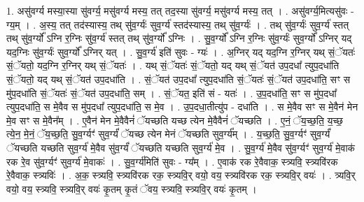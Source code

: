 \documentclass[17pt]{extarticle}
\begin{document}
1. असु॑वर्ग्य मस्या॒स्या सु॑वर्ग्य॒ मसु॑वर्ग्य मस्य॒ तत् तद॒स्या सु॑वर्ग्य॒ मसु॑वर्ग्य मस्य॒ तत् । . असु॑वर्ग्य॒मित्यसु॑वः - ग्य॒म् । . अ॒स्य॒ तत् तद॑स्यास्य॒ तथ् सु॑व॒र्ग्यः॑ सुव॒र्ग्य॑ स्तद॑स्यास्य॒ तथ् सु॑व॒र्ग्यः॑ । . तथ् सु॑व॒र्ग्यः॑ सुव॒र्ग्य॑ स्तत् तथ् सु॑व॒र्ग्यो᳚ ऽग्नि र॒ग्निः सु॑व॒र्ग्य॑ स्तत् तथ् सु॑व॒र्ग्यो᳚ ऽग्निः । . सु॒व॒र्ग्यो᳚ ऽग्नि र॒ग्निः सु॑व॒र्ग्यः॑ सुव॒र्ग्यो᳚ ऽग्निर् यद् यद॒ग्निः सु॑व॒र्ग्यः॑ सुव॒र्ग्यो᳚ ऽग्निर् यत् । . सु॒व॒र्ग्य॑ इति॑ सुवः - ग्यः॑ । . अ॒ग्निर् यद् यद॒ग्नि र॒ग्निर् यथ् सं॒ॅयतः॑ सं॒ॅयतो॒ यद॒ग्नि र॒ग्निर् यथ् सं॒ॅयतः॑ । . यथ् सं॒ॅयतः॑ सं॒ॅयतो॒ यद् यथ् सं॒ॅयत॑ उप॒दधा᳚ त्युप॒दधा॑ति सं॒ॅयतो॒ यद् यथ् सं॒ॅयत॑ उप॒दधा॑ति । . सं॒ॅयत॑ उप॒दधा᳚ त्युप॒दधा॑ति सं॒ॅयतः॑ सं॒ॅयत॑ उप॒दधा॑ति॒ सꣳ स मु॑प॒दधा॑ति सं॒ॅयतः॑ सं॒ॅयत॑ उप॒दधा॑ति॒ सम् । . सं॒ॅयत॒ इति॑ सं - यतः॑ । . उ॒प॒दधा॑ति॒ सꣳ स मु॑प॒दधा᳚ त्युप॒दधा॑ति॒ स मे॒वैव स मु॑प॒दधा᳚ त्युप॒दधा॑ति॒ स मे॒व । . उ॒प॒दधा॒तीत्यु॑प - दधा॑ति । . स मे॒वैव सꣳ स मे॒वैन॑ मेन मे॒व सꣳ स मे॒वैन᳚म् । . ए॒वैन॑ मेन मे॒वैवैनं॑ ॅयच्छति यच्छ त्येन मे॒वैवैनं॑ ॅयच्छति । . ए॒नं॒ ॅय॒च्छ॒ति॒ य॒च्छ॒ त्ये॒न॒ मे॒नं॒ ॅय॒च्छ॒ति॒ सु॒व॒र्ग्यꣳ॑ सुव॒र्ग्यं॑ ॅयच्छ त्येन मेनं ॅयच्छति सुव॒र्ग्य᳚म् । . य॒च्छ॒ति॒ सु॒व॒र्ग्यꣳ॑ सुव॒र्ग्यं॑ ॅयच्छति यच्छति सुव॒र्ग्य॑ मे॒वैव सु॑व॒र्ग्यं॑ ॅयच्छति यच्छति सुव॒र्ग्य॑ मे॒व । . सु॒व॒र्ग्य॑ मे॒वैव सु॑व॒र्ग्यꣳ॑ सुव॒र्ग्य॑ मे॒वाक॑ रक रे॒व सु॑व॒र्ग्यꣳ॑ सुव॒र्ग्य॑ मे॒वाकः॑ । . सु॒व॒र्ग्य॑मिति॑ सुवः - ग्य᳚म् । . ए॒वाक॑ रक रे॒वैवाक॒ स्त्र्यवि॒ स्त्र्यवि॑रक रे॒वैवाक॒ स्त्र्यविः॑ । . अ॒क॒ स्त्र्यवि॒ स्त्र्यवि॑रक रक॒ स्त्र्यवि॒र् वयो॒ वय॒ स्त्र्यवि॑रक रक॒ स्त्र्यवि॒र् वयः॑ । . त्र्यवि॒र् वयो॒ वय॒ स्त्र्यवि॒ स्त्र्यवि॒र् वयः॑ कृ॒तम् कृ॒तं ॅवय॒ स्त्र्यवि॒ स्त्र्यवि॒र् वयः॑ कृ॒तम् । \newline
\end{document}
